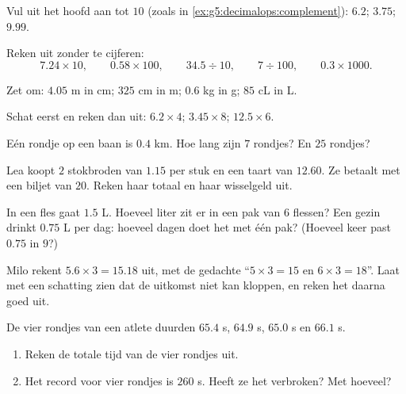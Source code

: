 \begin{exercise}[$\star$]\label{exo:g5:decimalops:3}
Vul uit het hoofd aan tot $10$ (zoals in
\cref{ex:g5:decimalops:complement}): $6.2$; \quad $3.75$; \quad $9.99$.
\end{exercise}

\begin{exercise}[$\star$]\label{exo:g5:decimalops:4}
Reken uit zonder te cijferen:
\[
7.24 \times 10, \qquad
0.58 \times 100, \qquad
34.5 \div 10, \qquad
7 \div 100, \qquad
0.3 \times 1000 .
\]
\end{exercise}

\begin{exercise}[$\star$]\label{exo:g5:decimalops:5}
Zet om: $4.05$ m in cm; \quad $325$ cm in m; \quad $0.6$ kg in g; \quad
$85$ cL in L.
\end{exercise}

\begin{exercise}[$\star$]\label{exo:g5:decimalops:6}
Schat eerst en reken dan uit: $6.2 \times 4$; \quad $3.45 \times 8$; \quad
$12.5 \times 6$.
\end{exercise}

\begin{exercise}[$\star$]\label{exo:g5:decimalops:7}
Eén rondje op een baan is $0.4$ km. Hoe lang zijn $7$ rondjes? En $25$
rondjes?
\end{exercise}

\begin{exercise}[$\star$]\label{exo:g5:decimalops:8}
Lea koopt $2$ stokbroden van $1.15$ per stuk en een taart van $12.60$. Ze
betaalt met een biljet van $20$. Reken haar totaal en haar wisselgeld uit.
\end{exercise}

\begin{exercise}[$\star$]\label{exo:g5:decimalops:9}
In een fles gaat $1.5$ L. Hoeveel liter zit er in een pak van $6$ flessen?
Een gezin drinkt $0.75$ L per dag: hoeveel dagen doet het met één pak?
(Hoeveel keer past $0.75$ in $9$?)
\end{exercise}

\begin{exercise}[$\star\star$]\label{exo:g5:decimalops:10}
Milo rekent $5.6 \times 3 = 15.18$ uit, met de gedachte ``$5 \times 3 = 15$
en $6 \times 3 = 18$''. Laat met een schatting zien dat de uitkomst niet kan
kloppen, en reken het daarna goed uit.
\end{exercise}

\begin{exercise}[$\star\star$]\label{exo:g5:decimalops:11}
De vier rondjes van een atlete duurden $65.4$ s, $64.9$ s, $65.0$ s en
$66.1$ s.
\begin{enumerate}
  \item Reken de totale tijd van de vier rondjes uit.
  \item Het record voor vier rondjes is $260$ s. Heeft ze het verbroken? Met
        hoeveel?
\end{enumerate}
\end{exercise}
